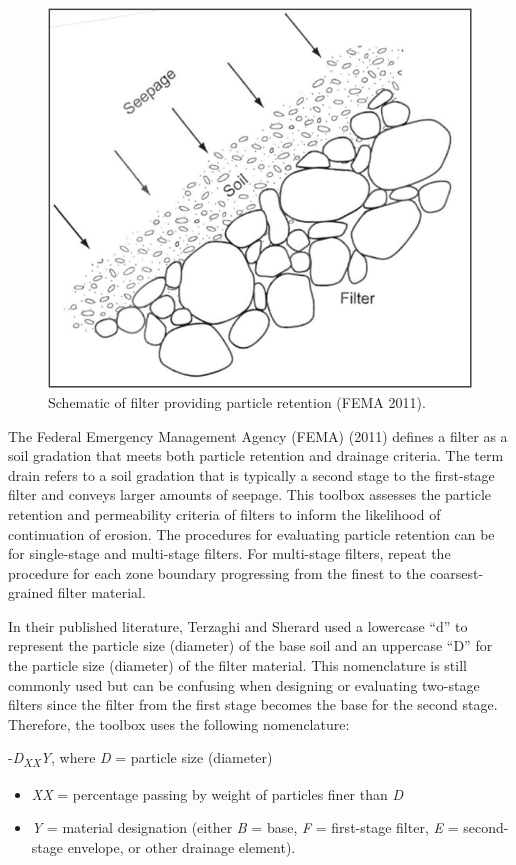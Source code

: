 \documentclass[
]{book}
\begin{document}
\begin{figure}

{\centering \includegraphics{images/figure8} 

}

\caption{Schematic of filter providing particle retention (FEMA 2011).}\label{fig:figure-8}
\end{figure}

The Federal Emergency Management Agency (FEMA) (2011) defines a filter as a soil gradation that meets both particle retention and drainage criteria. The term drain refers to a soil gradation that is typically a second stage to the first-stage filter and conveys larger amounts of seepage. This toolbox assesses the particle retention and permeability criteria of filters to inform the likelihood of continuation of erosion. The procedures for evaluating particle retention can be for single-stage and multi-stage filters. For multi-stage filters, repeat the procedure for each zone boundary progressing from the finest to the coarsest-grained filter material.

In their published literature, Terzaghi and Sherard used a lowercase ``d'' to represent the particle size (diameter) of the base soil and an uppercase ``D'' for the particle size (diameter) of the filter material. This nomenclature is still commonly used but can be confusing when designing or evaluating two-stage filters since the filter from the first stage becomes the base for the second stage. Therefore, the toolbox uses the following nomenclature:

-\emph{D\textsubscript{XX}Y}, where \emph{D} = particle size (diameter)

\begin{itemize}
\item
  \emph{XX} = percentage passing by weight of particles finer than \emph{D}
\item
  \emph{Y} = material designation (either \emph{B} = base, \emph{F} = first-stage filter, \emph{E} = second-stage envelope, or other drainage element).
\end{itemize}

  
\end{document}
